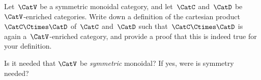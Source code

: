 
\begin{gradedexercise}
    \label{ex:ProductOfEnrichedCats}
    Let~$\CatV$ be a symmetric monoidal category, and let~$\CatC$ and~$\CatD$ be~$\CatV$-enriched categories.
    Write down a definition of the cartesian product~$\CatC \Ctimes \CatD$ of~$\CatC$ and~$\CatD$ such that~$\CatC \Ctimes \CatD$ is again a~$\CatV$-enriched category, and provide a proof that this is indeed true for your definition.

    Is it needed that $\CatV$ be \emph{symmetric} monoidal?
    If yes, were is symmetry needed?
\end{gradedexercise}

